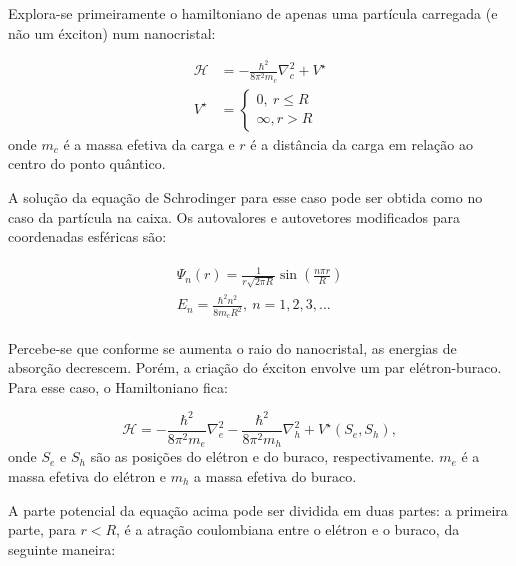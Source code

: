 	\par Explora-se primeiramente o hamiltoniano de apenas uma partícula carregada (e não um éxciton) num nanocristal:

	\begin{align}
		\label{confinamento_9}
		\displaystyle \mathcal{H} &= -\frac{\hbar^2}{8\pi^2m_{c}}\nabla^2_{c} + V^{\star}\\
		\displaystyle 
			V^{\star} &=
			\left\{
	          \begin{array}{ll}
	            \displaystyle 0,\ r \leq R\\
	            \displaystyle \infty, r > R
	          \end{array}
	        \right.
	\end{align}
	onde $m_{c}$ é a massa efetiva da carga e $r$ é a distância da carga em relação ao centro do ponto quântico.
	
	\par A solução da equação de Schrodinger para esse caso pode ser obtida como no caso da partícula na caixa. Os autovalores e autovetores modificados para coordenadas esféricas são: 

	\begin{align}
		\label{confinamento_10}
	      \begin{array}{ll}
	        \displaystyle \Psi_n(r) = \frac{1}{r\sqrt{2\pi R}}\sin\left(\frac{n\pi r}{R}\right)\\
	        \displaystyle E_{n} = \frac{\hbar^2 n^2}{8m_{c}R^2},\ n=1,2,3,...
	      \end{array}
	\end{align}

	\par Percebe-se que conforme se aumenta o raio do nanocristal, as energias de absorção decrescem.
	Porém, a criação do éxciton envolve um par elétron-buraco. Para esse caso, o Hamiltoniano fica:

	\begin{equation}
		\label{confinamento_11}
		\mathcal{H} = -\frac{\hbar^2}{8\pi^2 m_{e}}\nabla^2_{e} - \frac{\hbar^2}{8\pi^2 m_{h}}\nabla^2_{h}
			+ V^{\star}(S_{e}, S_{h}),
	\end{equation}
	onde $S_{e}$ e $S_{h}$ são as posições do elétron e do buraco, respectivamente. $m_{e}$ é a massa efetiva do elétron e $m_{h}$ a massa efetiva do buraco.
	
	\par A parte potencial da equação acima pode ser dividida em duas partes: a primeira parte, para $r<R$, é a atração coulombiana entre o elétron e o buraco, da seguinte maneira:

